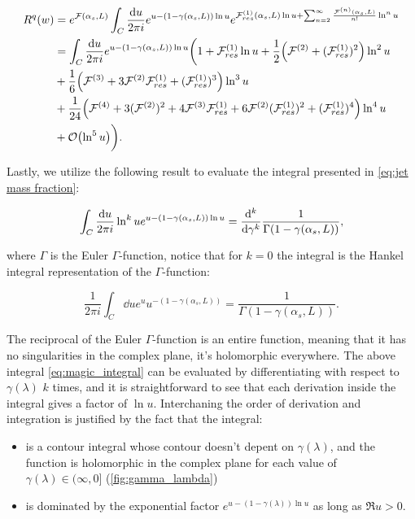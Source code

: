 \documentclass[../Tesi_Jiahao_Miao_986136.tex]{subfiles}
\begin{document}
\begin{align}
    \begin{split}
        R^q(w) &= e^{\mathcal{F}(\alpha_s,L)} \int_C \frac{\dd u}{2\pi i} e^{u-(1-\gamma(\alpha_s,L))\ln u} e^{\mathcal{F}^{(1)}_{res}(\alpha_s,L) \ln u +\sum_{n=2}^\infty \frac{\mathcal{F}^{(n)}(\alpha_s,L)}{n!}  \ln^n u}\\
        &= \int_C \frac{\dd u}{2\pi i} e^{u-(1-\gamma(\alpha_s,L))\ln u} \biggl( 1 + \mathcal{F}^{(1)}_{res}\ln u +\frac{1}{2}\qty( \mathcal{F}^{(2)}+(\mathcal{F}^{(1)}_{res})^2)\ln^2 u \\
        &+ \frac{1}{6}\qty(\mathcal{F}^{(3)} + 3 \mathcal{F}^{(2)}\mathcal{F}^{(1)}_{res} + (\mathcal{F}^{(1)}_{res})^3 ) \ln^3 u \\
        &+ \frac{1}{24}\qty(\mathcal{F}^{(4)} + 3(\mathcal{F}^{(2)})^2 + 4 \mathcal{F}^{(3)} \mathcal{F}^{(1)}_{res} + 6 \mathcal{F}^{(2)} (\mathcal{F}^{(1)}_{res})^2 + (\mathcal{F}^{(1)}_{res})^4 )\ln^4 u \\
        &+ \order{\ln^5 u} \biggr).
    \end{split}
\end{align}

Lastly, we utilize the following result to evaluate the integral presented in \cref{eq:jet mass fraction}:

\begin{equation}\label{eq:magic_integral}
    \int_C \frac{\dd u}{2\pi i} \ln^k u e^{u-(1-\gamma(\alpha_s,L))\ln u} = \dv[k]{\gamma} \frac{1}{\Gamma(1-\gamma(\alpha_s,L))},
\end{equation}

where $\Gamma$ is the Euler $\Gamma$-function, notice that for $k=0$ the integral is the Hankel integral representation of the $\Gamma$-function:

\begin{equation}\label{eq:hankel_integral_representation}
    \frac{1}{2\pi i}\int_C \dd u e^{u} u^{-(1-\gamma(\alpha_s,L))} = \frac{1}{\Gamma(1-\gamma(\alpha_s,L))}.
\end{equation}

The reciprocal of the Euler $\Gamma$-function is an entire function, meaning that it has no singularities in the complex plane, it's holomorphic everywhere.
The above integral \cref{eq:magic_integral} can be evaluated by differentiating with respect to $\gamma(\lambda)$ $k$ times, and it is straightforward to see that each derivation inside the integral
gives a factor of $\ln u$. Interchaning the order of derivation and integration is justified by the fact that the integral:
\begin{itemize}
    \item  is a contour integral whose contour doesn't depent on $\gamma(\lambda)$, and the function is holomorphic in the complex plane for each value of $\gamma(\lambda) \in (\infty,0]$ (\cref{fig:gamma_lambda})
    \item  is dominated by the exponential factor $e^{u - (1-\gamma(\lambda)) \ln u}$ as long as $\Re{u}>0$.  
\end{itemize}
\end{document}
